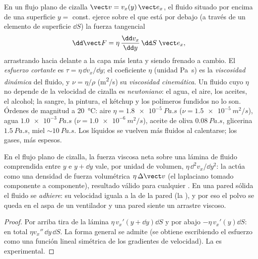\begin{definition}\label{def:b2:viscous-flows:viscosity}
En un flujo plano de cizalla $\vect v = v_x(y)\,\vect e_x$, el fluido
situado por encima de una superficie $y = $ const. ejerce sobre el que está
por debajo (a través de un elemento de superficie $\dd S$) la fuerza tangencial
\[
\dd\vect F = \eta\,\frac{\dd v_x}{\dd y}\,\dd S\;\vect e_x ,
\]
arrastrando hacia delante a la capa más lenta y siendo frenado a cambio.
El \emph{esfuerzo cortante} es $\tau = \eta\,\dd v_x/\dd y$; el coeficiente
$\eta$ (unidad \unit{Pa.s}) es la \emph{viscosidad dinámica} del fluido, y
$\nu = \eta/\rho$ (\unit{m^2/s}) su \emph{viscosidad cinemática}. Un fluido
cuyo $\eta$ no depende de la velocidad de cizalla es \emph{newtoniano}: el
agua, el aire, los aceites, el alcohol; la sangre, la pintura, el kétchup
y los polímeros fundidos no lo son. Órdenes de magnitud a \qty{20}{\degreeCelsius}: aire $\eta =
\qty{1.8e-5}{Pa.s}$ ($\nu = \qty{1.5e-5}{m^2/s}$), agua $\qty{1.0e-3}{Pa.s}$
($\nu = \qty{1.0e-6}{m^2/s}$), aceite de oliva $\qty{0.08}{Pa.s}$, glicerina
$\qty{1.5}{Pa.s}$, miel $\sim\qty{10}{Pa.s}$. Los líquidos se vuelven más
fluidos al calentarse; los gases, más espesos.
\end{definition}

\begin{proposition}\label{prop:b2:viscous-flows:density}
En el flujo plano de cizalla, la fuerza viscosa neta sobre una lámina de
fluido comprendida entre $y$ e $y + \dd y$ vale, por unidad de volumen,
$\eta\,\dd^2v_x/\dd y^2$: la  actúa como una densidad de fuerza
volumétrica $\eta\,\Delta\vect v$ (el laplaciano tomado componente a
componente), resultado válido para cualquier . En una
pared sólida el fluido se \emph{adhiere}: su velocidad iguala a la de la
pared (la \emph{}), y por eso el polvo se queda en
el aspa de un ventilador y una pared siente un arrastre viscoso.
\end{proposition}

\begin{proof}
Por arriba tira de la lámina $\eta\,v_x'(y + \dd y)\dd S$ y por abajo
$-\eta\,v_x'(y)\dd S$: en total $\eta v_x''\,\dd y\,\dd S$. La forma general
se admite (se obtiene escribiendo el esfuerzo como una función lineal
simétrica de los gradientes de velocidad). La  es
experimental.
\end{proof}

